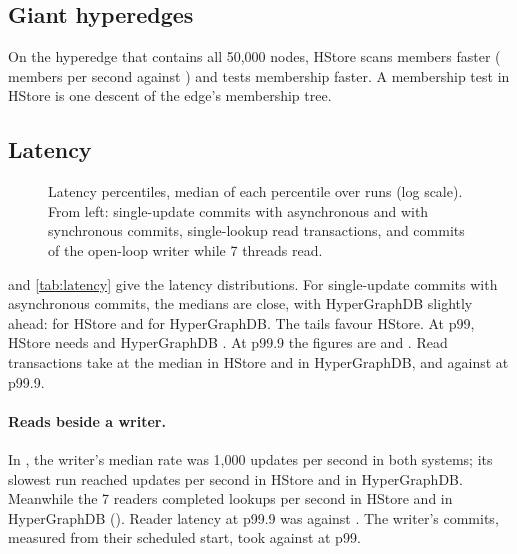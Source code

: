 \subsection{Giant hyperedges}

On the hyperedge that contains all 50,000 nodes, HStore scans members  faster ( members per second against ) and tests membership  faster. A membership test in HStore is one descent of the edge's membership tree.

\subsection{Latency}
\label{sec:latency}

\begin{figure}[t]
\centering

\caption{Latency percentiles, median of each percentile over runs (log scale). From left: single-update commits with asynchronous and with synchronous commits, single-lookup read transactions, and commits of the open-loop writer while 7 threads read.}
\label{fig:latency}
\end{figure}

\begin{table}[t]
\centering\footnotesize
\caption{S1 async: latency per operation, median of each percentile over runs.}
\label{tab:latency}

\end{table}

 and \cref{tab:latency} give the latency distributions. For single-update commits with asynchronous commits, the medians are close, with HyperGraphDB slightly ahead:  for HStore and  for HyperGraphDB. The tails favour HStore. At p99, HStore needs  and HyperGraphDB . At p99.9 the figures are  and . Read transactions take  at the median in HStore and  in HyperGraphDB, and  against  at p99.9.

\paragraph{Reads beside a writer.} In , the writer's median rate was 1,000 updates per second in both systems; its slowest run reached  updates per second in HStore and  in HyperGraphDB. Meanwhile the 7 readers completed  lookups per second in HStore and  in HyperGraphDB (). Reader latency at p99.9 was  against . The writer's commits, measured from their scheduled start, took  against  at p99.

